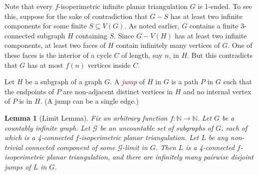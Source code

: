 \documentclass[a4paper,11pt]{article}
\newcommand{\defn}[1]{\textcolor{Maroon}{\emph{#1}}\index{#1}}
\theoremstyle{plain}
\newtheorem{lem}[thm]{Lemma}
\theoremstyle{definition}
\newcommand{\FF}{\mathcal{F}}
\newcommand{\GG}{\mathcal{G}}
\newcommand{\NN}{\mathbb{N}}
\begin{document}
Note that every $f$-isoperimetric infinite planar triangulation $G$ is 1-ended. To see this, suppose for the sake of contradiction that $G-S$ has at least two infinite components for some finite $S\subseteq V(G)$. As noted earlier, $G$ contains a finite 3-connected subgraph $H$ containing $S$. Since $G-V(H)$ has at least two infinite components, at least two faces of $H$ contain infinitely many vertices of $G$. One of these faces is the interior of a cycle $C$ of length, say $n$, in $H$. But this contradicts that $G$ has at most $f(n)$ vertices inside $C$.


Let $H$ be a subgraph of a graph $G$. A \defn{jump} of $H$ in $G$ is a path $P$ in $G$  such that the endpoints of $P$ are non-adjacent distinct vertices in $H$ and no internal vertex of $P$ is in $H$. (A jump can be a single edge.)

\begin{lem}[Limit Lemma]
\label{LimitLemma}
Fix an arbitrary function $f:\NN\to\NN$. Let $G$ be a countably infinite graph. Let $\GG$ be an uncountable set of subgraphs of $G$, each of which is a 4-connected $f$-isoperimetric planar triangulation. Let $L$ be any non-trivial connected component of some $\GG$-limit in $G$.  Then $L$ is a 4-connected $f$-isoperimetric planar triangulation, and there are infinitely many pairwise disjoint jumps of $L$ in $G$. 
\end{lem}
\end{document}
